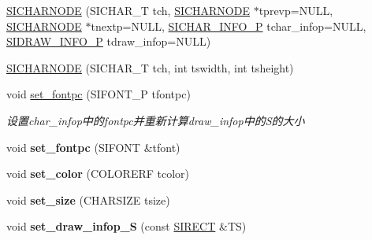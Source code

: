 \begin{DoxyCompactItemize}
\item 
\hyperlink{class_s_i_c_h_a_r_n_o_d_e_a69da1200fe43cf1aab75e44650cdd21b}{S\+I\+C\+H\+A\+R\+N\+O\+DE} (S\+I\+C\+H\+A\+R\+\_\+T tch, \hyperlink{class_s_i_c_h_a_r_n_o_d_e}{S\+I\+C\+H\+A\+R\+N\+O\+DE} $\ast$tprevp=N\+U\+LL, \hyperlink{class_s_i_c_h_a_r_n_o_d_e}{S\+I\+C\+H\+A\+R\+N\+O\+DE} $\ast$tnextp=N\+U\+LL, \hyperlink{class_s_i_c_h_a_r___i_n_f_o}{S\+I\+C\+H\+A\+R\+\_\+\+I\+N\+F\+O\+\_\+P} tchar\+\_\+infop=N\+U\+LL, \hyperlink{class_s_i_d_r_a_w___i_n_f_o}{S\+I\+D\+R\+A\+W\+\_\+\+I\+N\+F\+O\+\_\+P} tdraw\+\_\+infop=N\+U\+LL)
\item 
\hyperlink{class_s_i_c_h_a_r_n_o_d_e_aa06366dc16bf0aab9d16aaf43be0f8a3}{S\+I\+C\+H\+A\+R\+N\+O\+DE} (S\+I\+C\+H\+A\+R\+\_\+T tch, int tswidth, int tsheight)
\item 
\mbox{\label{class_s_i_c_h_a_r_n_o_d_e_aad179bc8f8fc9a4789e0b9ba06ecef9a}} 
void \hyperlink{class_s_i_c_h_a_r_n_o_d_e_aad179bc8f8fc9a4789e0b9ba06ecef9a}{set\+\_\+fontpc} (S\+I\+F\+O\+N\+T\+\_\+P tfontpc)
\begin{DoxyCompactList}\small\item\em 设置char\+\_\+infop中的fontpc并重新计算draw\+\_\+infop中的\+S的大小 \end{DoxyCompactList}\item 
\mbox{\label{class_s_i_c_h_a_r_n_o_d_e_a31c2182d80551b2d92cc13f8c966d5e7}} 
void {\bfseries set\+\_\+fontpc} (S\+I\+F\+O\+NT \&tfont)
\item 
\mbox{\label{class_s_i_c_h_a_r_n_o_d_e_a178979e4d98192f354dcccf93b18202b}} 
void {\bfseries set\+\_\+color} (C\+O\+L\+O\+R\+E\+RF tcolor)
\item 
\mbox{\label{class_s_i_c_h_a_r_n_o_d_e_a22ad69de5483e52b83a380d700112d33}} 
void {\bfseries set\+\_\+size} (C\+H\+A\+R\+S\+I\+ZE tsize)
\item 
\mbox{\label{class_s_i_c_h_a_r_n_o_d_e_ab6b5d998c28439e54749bb5502cdeec2}} 
void {\bfseries set\+\_\+draw\+\_\+infop\+\_\+S} (const \hyperlink{struct_s_i_r_e_c_t}{S\+I\+R\+E\+CT} \&TS)
\item 
\mbox{\label{class_s_i_c_h_a_r_n_o_d_e_abe788ffb5847e2be9bb047d57e8666f7}} 

\end{DoxyCompactItemize}
